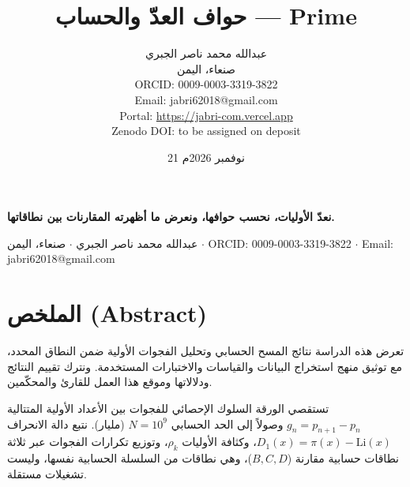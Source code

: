 \documentclass[12pt,a4paper]{article}
\title{\textbf{حواف العدّ والحساب — \textenglish{Prime}}}
\author{عبدالله محمد ناصر الجبري \\
صنعاء، اليمن \\
\textenglish{ORCID: 0009-0003-3319-3822} \\
\textenglish{Email: jabri62018@gmail.com} \\
\textenglish{Portal: \url{https://jabri-com.vercel.app}} \\
\textenglish{Zenodo DOI: to be assigned on deposit}}
\date{21 نوفمبر 2026م}
\begin{document}
\maketitle
\thispagestyle{firstpage}

\begin{center}
\end{center}
\vspace{0.3cm}

\begin{center}
\textbf{نعدّ الأوليات، نحسب حوافها، ونعرض ما أظهرته المقارنات بين نطاقاتها.}
\end{center}
\begin{center}
\small عبدالله محمد ناصر الجبري \quad $\cdot$ \quad صنعاء، اليمن \quad $\cdot$ \quad \textenglish{ORCID: 0009-0003-3319-3822} \quad $\cdot$ \quad \textenglish{Email: jabri62018@gmail.com}
\end{center}
\vspace{0.5cm}

\section{الملخص (\textenglish{Abstract})}
تعرض هذه الدراسة نتائج المسح الحسابي وتحليل الفجوات الأولية ضمن النطاق المحدد، مع توثيق منهج استخراج البيانات والقياسات والاختبارات المستخدمة. ونترك تقييم النتائج ودلالاتها وموقع هذا العمل للقارئ والمحكّمين.

تستقصي الورقة السلوك الإحصائي للفجوات بين الأعداد الأولية المتتالية $g_n = p_{n+1} - p_n$ وصولاً إلى الحد الحسابي $N = 10^9$ (مليار). نتبع دالة الانحراف $D_1(x) = \pi(x) - \mathrm{Li}(x)$، وكثافة الأوليات $\rho_k$، وتوزيع تكرارات الفجوات عبر ثلاثة نطاقات حسابية مقارنة ($B, C, D$)، وهي نطاقات من السلسلة الحسابية نفسها، وليست تشغيلات مستقلة.
\end{document}
